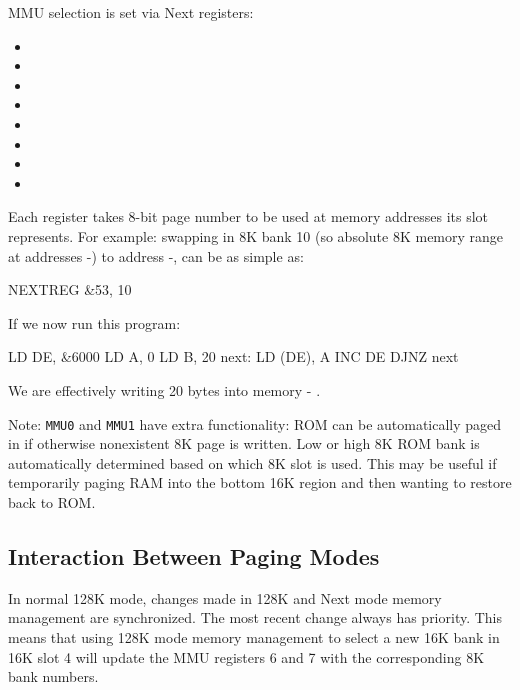 MMU selection is set via Next registers:

\begin{itemize}[topsep=1pt,itemsep=1pt]
	\item {}
	\item {}
	\item {}
	\item {}
	\item {}
	\item {}
	\item {}
	\item {}
\end{itemize}

Each register takes 8-bit page number to be used at memory addresses its slot represents. For example: swapping in 8K bank 10 (so absolute 8K memory range at addresses -) to address -, can be as simple as:

\begin{tcblisting}{}
	NEXTREG &53, 10
\end{tcblisting}

If we now run this program:

\begin{tcblisting}{}
	LD DE, &6000
	LD A, 0
	LD B, 20
next:
	LD (DE), A
	INC DE
	DJNZ next
\end{tcblisting}

We are effectively writing 20 bytes into memory  - .

Note: {\tt MMU0} and {\tt MMU1} have extra functionality: ROM can be automatically paged in if otherwise nonexistent 8K page  is written. Low or high 8K ROM bank is automatically determined based on which 8K slot is used. This may be useful if temporarily paging RAM into the bottom 16K region and then wanting to restore back to ROM.

\pagebreak

\subsection{Interaction Between Paging Modes}

In normal 128K mode, changes made in 128K and Next mode memory management are synchronized. The most recent change always has priority. This means that using 128K mode memory management to select a new 16K bank in 16K slot 4 will update the MMU registers 6 and 7 with the corresponding 8K bank numbers.

